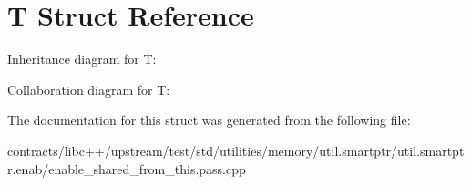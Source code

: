 \hypertarget{struct_t}{}\section{T Struct Reference}
\label{struct_t}


Inheritance diagram for T\+:


Collaboration diagram for T\+:


The documentation for this struct was generated from the following file\+:\begin{DoxyCompactItemize}
\item 
contracts/libc++/upstream/test/std/utilities/memory/util.\+smartptr/util.\+smartptr.\+enab/enable\+\_\+shared\+\_\+from\+\_\+this.\+pass.\+cpp\end{DoxyCompactItemize}
